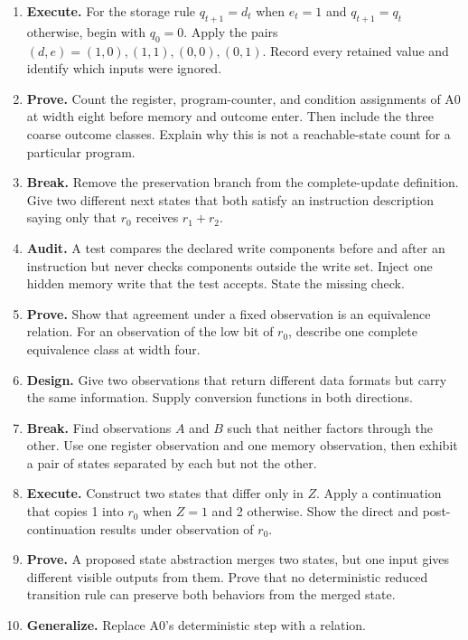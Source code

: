 \begin{enumerate}
Give two histories that reach visible bit zero and then produce different
answers to the same next command. State both honest repairs to its model.
\item \textbf{Execute.} For the storage rule
\(q_{t+1}=d_t\) when \(e_t=1\) and \(q_{t+1}=q_t\) otherwise, begin with
\(q_0=0\). Apply the pairs \((d,e)=(1,0),(1,1),(0,0),(0,1)\). Record every
retained value and identify which inputs were ignored.
\item \textbf{Prove.} Count the register, program-counter, and condition
assignments of A0 at width eight before memory and outcome enter. Then include
the three coarse outcome classes. Explain why this is not a reachable-state
count for a particular program.
\item \textbf{Break.} Remove the preservation branch from the complete-update
definition. Give two different next states that both satisfy an instruction
description saying only that \(r_0\) receives \(r_1+r_2\).
\item \textbf{Audit.} A test compares the declared write components before and
after an instruction but never checks components outside the write set. Inject
one hidden memory write that the test accepts. State the missing check.
\item \textbf{Prove.} Show that agreement under a fixed observation is an
equivalence relation. For an observation of the low bit of \(r_0\), describe
one complete equivalence class at width four.
\item \textbf{Design.} Give two observations that return different data
formats but carry the same information. Supply conversion functions in both
directions.
\item \textbf{Break.} Find observations \(A\) and \(B\) such that neither
factors through the other. Use one register observation and one memory
observation, then exhibit a pair of states separated by each but not the
other.
\item \textbf{Execute.} Construct two states that differ only in \(Z\). Apply
a continuation that copies 1 into \(r_0\) when \(Z=1\) and 2 otherwise. Show
the direct and post-continuation results under observation of \(r_0\).
\item \textbf{Prove.} A proposed state abstraction merges two states, but one
input gives different visible outputs from them. Prove that no deterministic
reduced transition rule can preserve both behaviors from the merged state.
\item \textbf{Generalize.} Replace A0's deterministic step with a relation.

\end{enumerate}
